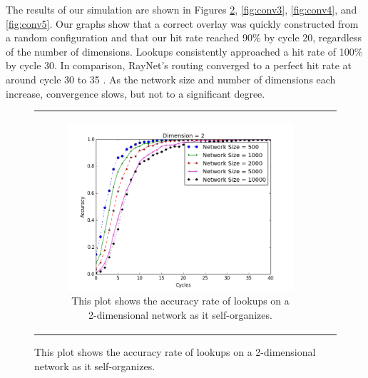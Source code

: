 The results of our simulation are shown in Figures \ref{fig:conv2}, \ref{fig:conv3}, \ref{fig:conv4}, and \ref{fig:conv5}.
Our graphs show that a correct overlay was quickly constructed from a random configuration and that our hit rate reached 90\% by cycle 20, regardless of the number of dimensions.
Lookups consistently approached a hit rate of 100\% by cycle 30.
In comparison, RayNet's routing converged to a perfect hit rate at around cycle 30 to 35 \cite{raynet}.
As the network size and number of dimensions each increase, convergence slows, but not to a significant degree.

\begin{figure}
	\label{fig:conv}
	\centering
	\begin{tabular}{cc}

		\begin{subfigure}{0.5\columnwidth}
			\includegraphics[width=\linewidth]{figs/conv_d2}
			\caption{This plot shows the accuracy rate of lookups on a 2-dimensional network as it self-organizes.}
			\label{fig:conv2}
		\end{subfigure} &


\end{tabular}
\end{figure}
